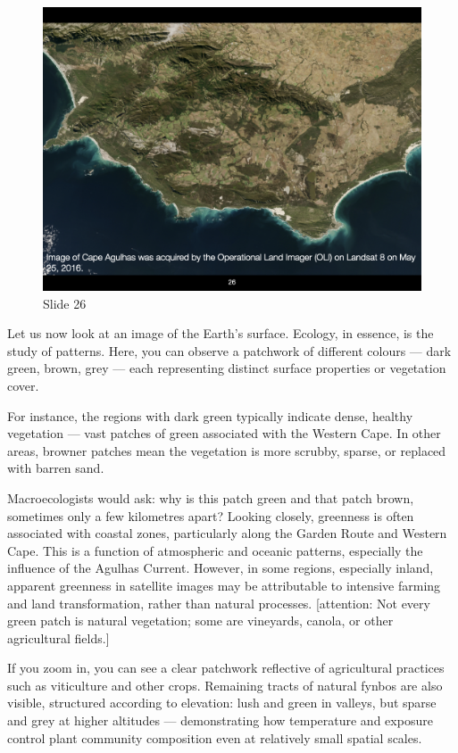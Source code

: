 \documentclass[
  12pt,
]{book}
\begin{document}
\begin{figure}[ht]
\centering
\includegraphics[width=0.8\linewidth]{../images/BDC334/BDC334-026.jpeg}
\caption*{Slide 26}
\end{figure}

Let us now look at an image of the Earth's surface. Ecology, in essence,
is the study of patterns. Here, you can observe a patchwork of different
colours --- dark green, brown, grey --- each representing distinct
surface properties or vegetation cover.

For instance, the regions with dark green typically indicate dense,
healthy vegetation --- vast patches of green associated with the Western
Cape. In other areas, browner patches mean the vegetation is more
scrubby, sparse, or replaced with barren sand.

Macroecologists would ask: why is this patch green and that patch brown,
sometimes only a few kilometres apart? Looking closely, greenness is
often associated with coastal zones, particularly along the Garden Route
and Western Cape. This is a function of atmospheric and oceanic
patterns, especially the influence of the Agulhas Current. However, in
some regions, especially inland, apparent greenness in satellite images
may be attributable to intensive farming and land transformation, rather
than natural processes. {[}attention: Not every green patch is natural
vegetation; some are vineyards, canola, or other agricultural fields.{]}

If you zoom in, you can see a clear patchwork reflective of agricultural
practices such as viticulture and other crops. Remaining tracts of
natural fynbos are also visible, structured according to elevation: lush
and green in valleys, but sparse and grey at higher altitudes ---
demonstrating how temperature and exposure control plant community
composition even at relatively small spatial scales.
\end{document}
